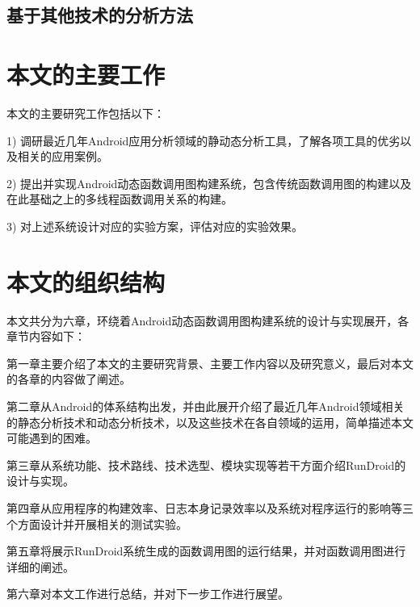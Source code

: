 \begin{comment}
CopperDroid points out how their system call-centric analysis and stimulation techniques can comprehensively expose Android malware behaviors. CopperDroid also comes with a web interface where users can submit unknown applications for analysis. 6.3.10 Closed frameworks A number of additional dynamic analysis platforms have been implemented and made available to the public via web applications. These frameworks, however, come with very little documentation on how they operate which makes it hard to make statements on any new approaches used by these implementations. It is likely that these platforms use (modified versions of) existing tools like DroidBox, TaintDroid and Androguard to complement their dynamic analysis engine. This is confirmed on SandDroid’s webpage, which states that it is powered by both DroidBox and Androguard7 . Example output reports of both ForeSafe8 and JoeSecurity9 suggest that these platforms use a combination of existing tools as well.

\end{comment}

\subsection{基于其他技术的分析方法}

\section{本文的主要工作}

本文的主要研究工作包括以下：

1)	调研最近几年Android应用分析领域的静动态分析工具，了解各项工具的优劣以及相关的应用案例。

2)	提出并实现Android动态函数调用图构建系统，包含传统函数调用图的构建以及在此基础之上的多线程函数调用关系的构建。

3)	对上述系统设计对应的实验方案，评估对应的实验效果。

\section{本文的组织结构}

本文共分为六章，环绕着Android动态函数调用图构建系统的设计与实现展开，各章节内容如下：

第一章主要介绍了本文的主要研究背景、主要工作内容以及研究意义，最后对本文的各章的内容做了阐述。

第二章从Android的体系结构出发，并由此展开介绍了最近几年Android领域相关的静态分析技术和动态分析技术，以及这些技术在各自领域的运用，简单描述本文可能遇到的困难。

第三章从系统功能、技术路线、技术选型、模块实现等若干方面介绍RunDroid的设计与实现。

第四章从应用程序的构建效率、日志本身记录效率以及系统对程序运行的影响等三个方面设计并开展相关的测试实验。

第五章将展示RunDroid系统生成的函数调用图的运行结果，并对函数调用图进行详细的阐述。

第六章对本文工作进行总结，并对下一步工作进行展望。
